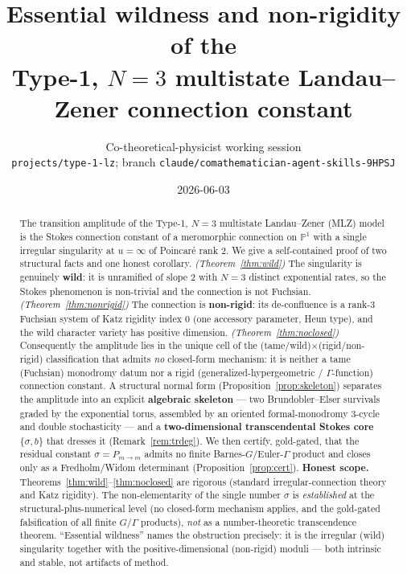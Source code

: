 \documentclass[11pt]{article}
\title{\vspace{-2em}\textbf{Essential wildness and non-rigidity of the \\ Type-1, $N{=}3$ multistate Landau--Zener connection constant}}
\author{Co-theoretical-physicist working session\\[2pt]
\small\texttt{projects/type-1-lz}; branch \texttt{claude/comathematician-agent-skills-9HPSJ}}
\date{2026-06-03}
\theoremstyle{definition}
\newcommand{\PP}{\mathbb{P}^1}
\newcommand{\Pmid}{P_{m\to m}}
\begin{document}
\maketitle
\vspace{-1.5em}

\begin{abstract}
The transition amplitude of the Type-1, $N{=}3$ multistate Landau--Zener (MLZ) model is the Stokes
connection constant of a meromorphic connection on $\PP$ with a single irregular singularity at $u=\infty$ of
Poincar\'e rank $2$. We give a self-contained proof of two structural facts and one honest corollary.
\emph{(Theorem~\ref{thm:wild})} The singularity is genuinely \textbf{wild}: it is unramified of slope $2$
with $N{=}3$ distinct exponential rates, so the Stokes phenomenon is non-trivial and the connection is not
Fuchsian. \emph{(Theorem~\ref{thm:nonrigid})} The connection is \textbf{non-rigid}: its de-confluence is a
rank-$3$ Fuchsian system of Katz rigidity index $0$ (one accessory parameter, Heun type), and the wild
character variety has positive dimension. \emph{(Theorem~\ref{thm:noclosed})} Consequently the amplitude lies
in the unique cell of the (tame/wild)$\times$(rigid/non-rigid) classification that admits \emph{no} closed-form
mechanism: it is neither a tame (Fuchsian) monodromy datum nor a rigid (generalized-hypergeometric /
$\Gamma$-function) connection constant. A structural normal form
(Proposition~\ref{prop:skeleton}) separates the amplitude into an explicit \textbf{algebraic skeleton} ---
two Brundobler--Elser survivals graded by the exponential torus, assembled by an oriented formal-monodromy
$3$-cycle and double stochasticity --- and a \textbf{two-dimensional transcendental Stokes core}
$\{\sigma,b\}$ that dresses it (Remark~\ref{rem:trdeg}). We then certify, gold-gated, that the residual
constant
$\sigma=\Pmid$ admits no finite Barnes-$G$/Euler-$\Gamma$ product and closes only as a Fredholm/Widom
determinant (Proposition~\ref{prop:cert}). \textbf{Honest scope.} Theorems~\ref{thm:wild}--\ref{thm:noclosed}
are rigorous (standard irregular-connection theory and Katz rigidity). The non-elementarity of the single
number $\sigma$ is \emph{established} at the structural-plus-numerical level (no closed-form mechanism applies,
and the gold-gated falsification of all finite $G/\Gamma$ products), \emph{not} as a number-theoretic
transcendence theorem. ``Essential wildness'' names the obstruction precisely: it is the irregular (wild)
singularity together with the positive-dimensional (non-rigid) moduli --- both intrinsic and stable, not
artifacts of method.
\end{abstract}
\end{document}
